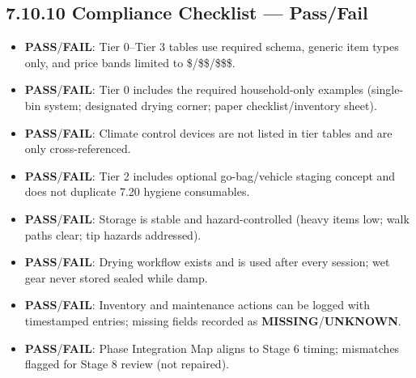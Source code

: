 \documentclass[10pt]{article}
\begin{document}
\subsection*{7.10.10 Compliance Checklist — Pass/Fail}
{}

\begin{itemize}
\item \textbf{PASS}/\textbf{FAIL}: Tier 0–Tier 3 tables use required schema, generic item types only, and price bands limited to \$/\$\$/\$\$\$.
\item \textbf{PASS}/\textbf{FAIL}: Tier 0 includes the required household-only examples (single-bin system; designated drying corner; paper checklist/inventory sheet).
\item \textbf{PASS}/\textbf{FAIL}: Climate control devices are not listed in tier tables and are only cross-referenced.
\item \textbf{PASS}/\textbf{FAIL}: Tier 2 includes optional go-bag/vehicle staging concept and does not duplicate 7.20 hygiene consumables.
\item \textbf{PASS}/\textbf{FAIL}: Storage is stable and hazard-controlled (heavy items low; walk paths clear; tip hazards addressed).
\item \textbf{PASS}/\textbf{FAIL}: Drying workflow exists and is used after every session; wet gear never stored sealed while damp.
\item \textbf{PASS}/\textbf{FAIL}: Inventory and maintenance actions can be logged with timestamped entries; missing fields recorded as \textbf{MISSING}/\textbf{UNKNOWN}.
\item \textbf{PASS}/\textbf{FAIL}: Phase Integration Map aligns to Stage 6 timing; mismatches flagged for Stage 8 review (not repaired).
\end{itemize}
\end{document}
